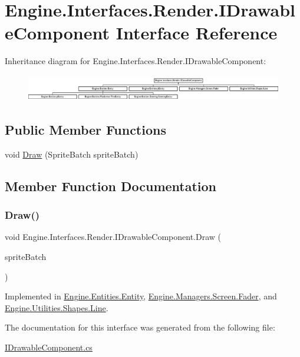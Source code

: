 \hypertarget{a00454}{}\section{Engine.\+Interfaces.\+Render.\+I\+Drawable\+Component Interface Reference}
\label{a00454}
Inheritance diagram for Engine.\+Interfaces.\+Render.\+I\+Drawable\+Component\+:\begin{figure}[H]
\begin{center}
\leavevmode
\includegraphics[height=1.166667cm]{d7/d9f/a00454}
\end{center}
\end{figure}
\subsection*{Public Member Functions}
\begin{DoxyCompactItemize}
\item 
void \hyperlink{a00454_a13aad31e3e179532915dbb93e91afaa3}{Draw} (Sprite\+Batch sprite\+Batch)
\end{DoxyCompactItemize}


\subsection{Member Function Documentation}
\mbox{\label{a00454_a13aad31e3e179532915dbb93e91afaa3}} 
\subsubsection{\texorpdfstring{Draw()}{Draw()}}
{\footnotesize\ttfamily void Engine.\+Interfaces.\+Render.\+I\+Drawable\+Component.\+Draw (\begin{DoxyParamCaption}\item[{Sprite\+Batch}]{sprite\+Batch }\end{DoxyParamCaption})}



Implemented in \hyperlink{a00314_a5c795930028c5672b54f95369b25019f}{Engine.\+Entities.\+Entity}, \hyperlink{a00534_a8a40165cf8a910849e01fb35b9567ee2}{Engine.\+Managers.\+Screen.\+Fader}, and \hyperlink{a00606_a8500392559da764797cdb92eb850a2ba}{Engine.\+Utilities.\+Shapes.\+Line}.



The documentation for this interface was generated from the following file\+:\begin{DoxyCompactItemize}
\item 
\hyperlink{a00122}{I\+Drawable\+Component.\+cs}\end{DoxyCompactItemize}
